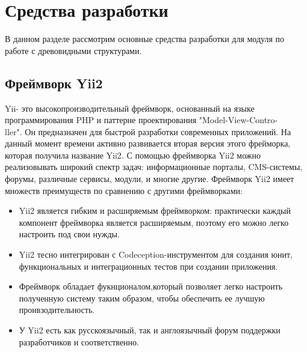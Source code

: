 \documentclass[a4paper,14pt]{extreport}
\theoremstyle{definition}
\begin{document}
\section{Средства разработки}
В данном разделе рассмотрим основные средства разработки для модуля по работе с древовидными структурами.
\subsection{Фреймворк Yii2}
Yii- это высокопроизводительный фреймворк, основанный на языке программирования PHP\cite{Lengstrof} и паттерне проектирования "Model-View-Contro-\\ller"\cite{Safronov}. Он предназначен для быстрой разработки современных приложений. На данный момент времени активно развивается вторая версия этого фрейморка, которая получила название Yii2. С помощью фреймворка Yii2 можно реализовывать широкий спектр задач: информационные порталы, CMS-системы, форумы, различные сервисы, модули, и многие другие.
Фреймворк Yii2 имеет множеств преимуществ по сравнению с другими фреймворками:
\begin{itemize}
\item Yii2 является гибким и расширяемым фреймворком: практически каждый компонент фреймворка является расширяемым, поэтому его можно легко настроить под свои нужды.
\item Yii2 тесно интегрирован с Codeception-инструментом для создания юнит, функциональных и интеграционных тестов при создании приложения.
\item Фреймворк обладает фукнционалом,который позволяет легко настроить полученную систему таким образом, чтобы обеспечить ее лучшую проивзодительность.
\item У Yii2 есть как русскоязычный\cite{Yii2Rus}, так и англоязычный\cite{Yii2} форум поддержки разработчиков и соответственно.
\end{itemize}
\end{document}
